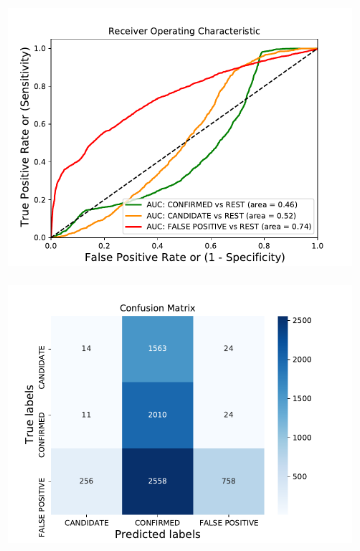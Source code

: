 \begin{figure}[H]
                \centering
                \begin{subfigure}{.49\textwidth}
                \includegraphics[width = 1\textwidth]{data/GaussianNB_overfit_roc.pdf}
                \end{subfigure}
                \begin{subfigure}{.49\textwidth}
                \includegraphics[width = 1\textwidth]{data/GaussianNB_overfit_cm.pdf}
                \end{subfigure}
                \begin{subfigure}{.49\textwidth}

\end{subfigure}
\end{figure}
